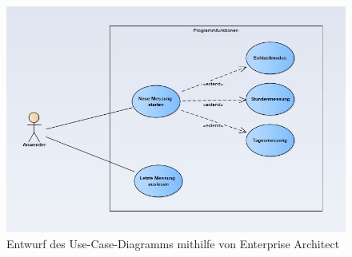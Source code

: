 \begin{figure}[!hbt]
	\centering
	\includegraphics[width=0.9\linewidth]{Images/UseCase}
	\caption{Entwurf des Use-Case-Diagramms mithilfe von Enterprise Architect}
	\label{fig:UseCase}
\end{figure}